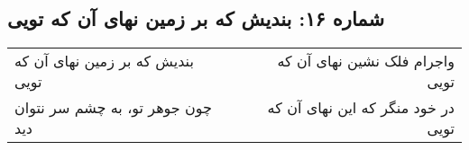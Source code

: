 \begin{center}
\section*{شماره ۱۶: بندیش که بر زمین نهای آن که تویی}
\label{sec:016}
\begin{longtable}{l p{0.5cm} r}
بندیش که بر زمین نهای آن که تویی
&&
واجرام فلک نشین نهای آن که تویی
\\
چون جوهر تو، به چشم سر نتوان دید
&&
در خود منگر که این نهای آن که تویی
\\
\end{longtable}
\end{center}
